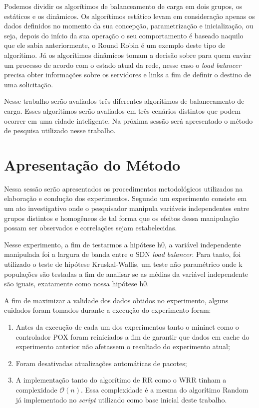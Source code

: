 \documentclass[12pt]{article}
\begin{document}
Podemos dividir os algorítimos de balanceamento de carga em dois grupos, os estáticos e os dinâmicos. Os algorítimos estático levam em consideração apenas os dados definidos no momento da sua concepção, parametrização e inicialização, ou seja, depois do início da sua operação o seu comportamento é baseado naquilo que ele sabia anteriormente, o Round Robin é um exemplo deste tipo de algorítimo. Já os algorítimos dinâmicos tomam a decisão sobre para quem enviar um processo de acordo com o estado atual da rede, nesse caso o \textit{load balancer} precisa obter informações sobre os servidores e links a fim de definir o destino de uma solicitação.

Nesse trabalho serão avaliados três diferentes algorítimos de balanceamento de carga. Esses algorítimos serão avaliados em três cenários distintos que podem ocorrer em uma cidade inteligente. Na próxima sessão será apresentado o método de pesquisa utilizado nesse trabalho.

\section{Apresentação do Método}

Nessa sessão serão apresentados os procedimentos metodológicos utilizados na elaboração e condução dos experimentos. Segundo \cite{Sampieri2013} um experimento consiste em um ato investigativo onde o pesquisador manipula variáveis independentes entre grupos distintos e homogêneos de tal forma que os efeitos dessa manipulação possam ser observados e correlações sejam estabelecidas.

Nesse experimento, a fim de testarmos a hipótese h0, a variável independente manipulada foi a largura de banda entre o SDN \textit{load balancer}. Para tanto, foi utilizado o teste de hipótese Kruskal-Wallis, um teste não paramétrico onde k populações são testadas a fim de analisar se as médias da variável independente são iguais, exatamente como nossa hipótese h0. 

A fim de maximizar a validade dos dados obtidos no experimento, alguns cuidados foram tomados durante a execução do experimento foram:

\begin{enumerate}
    \item Antes da execução de cada um dos experimentos tanto o mininet como o controlador POX foram reiniciados a fim de garantir que dados em cache do experimento anterior não afetassem o resultado do experimento atual;
    \item Foram desativadas atualizações automáticas de pacotes;
    \item A implementação tanto do algorítimo de RR como o WRR tinham a complexidade $\mathcal{O}(n)$. Essa complexidade é a mesma do algorítimo Random já implementado no \textit{script} utilizado como base inicial deste trabalho.
\end{enumerate}
\end{document}
